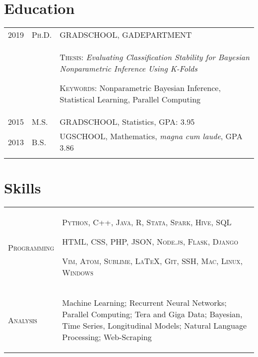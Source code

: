 \documentclass[a4paper,10pt]{article}
\begin{document}
\section{Education}
\begin{supertabular}{p{2cm} p{1.0cm} p{13.9cm}}
  \textsc{2019}		&		\textsc{Ph.D.} & \textsc{GRADSCHOOL}, \small GADEPARTMENT \\
          &&		 \begin{enumerate*}[label =$\diamond$, itemjoin={\newline}]
               \item \footnotesize \textsc{Thesis:} \emph{Evaluating Classification Stability for Bayesian Nonparametric Inference Using K-Folds}
               \item \footnotesize  \textsc{Keywords:} Nonparametric Bayesian Inference, Statistical Learning, Parallel Computing
               \end{enumerate*}  \\
	\textsc{2015} 	& 	\textsc{M.S.} & \textsc{GRADSCHOOL}, \small Statistics, GPA: 3.95  \\
	\textsc{2013} 	& 	\textsc{B.S.} & \textsc{UGSCHOOL}, \small Mathematics, \emph{magna cum laude}, GPA 3.86 \\
	 \\
\end{supertabular}


\section{Skills}
\begin{supertabular}{p{3.4cm} p{13.9cm}}

	\textsc{Programming}		& \begin{enumerate*}[label =$\diamond$, itemjoin={\newline}]
																\item \small \textsc{Python, C++, Java, R, Stata, Spark, Hive, SQL}
																\item \small \textsc{HTML, CSS, PHP, JSON, Node.js, Flask, Django}
																\item \small \textsc{Vim, Atom, Sublime, {\fb \LaTeX}, Git, SSH, Mac, Linux, Windows }
																\end{enumerate*} \vspace{2mm} \\


	\textsc{Analysis}				& \begin{enumerate*}[label =$\diamond$, itemjoin={\newline}]
                                \item \small Machine Learning; Recurrent Neural Networks; Parallel Computing; Tera and Giga Data; Bayesian, Time Series, Longitudinal Models; Natural Language Processing; Web-Scraping \end{enumerate*}  \vspace{1mm} \\



\end{supertabular}
\end{document}
